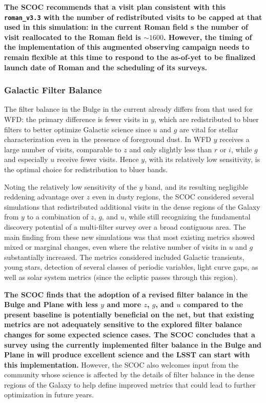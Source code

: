 {\bf The SCOC recommends that a visit plan consistent with this \texttt{roman\_v3.3} with the number of redistributed visits to be capped at that used in this simulation: in the current Roman field \opsim s the number of visit reallocated to the Roman field is $\sim1600$. However, the timing of the implementation of this augmented observing campaign needs to remain flexible at this time to respond to the as-of-yet to be finalized launch date of Roman and the scheduling of its surveys.}


\subsubsection{Galactic Filter Balance}\label{sec:subG:filterbalance}

The filter balance in the Bulge in the current  already differs from that used for WFD: the primary difference is fewer visits in $y$, which are redistributed to bluer filters to better optimize Galactic science since $u$ and $g$ are vital for stellar characterization even in the presence of foreground dust. In WFD $y$ receives a large number of visits, comparable to $z$ and only slightly less than $r$ or $i$, while $g$ and especially $u$ receive fewer visits. Hence $y$, with its relatively low sensitivity, is the optimal choice for redistribution to bluer bands.

Noting the relatively low sensitivity of the $y$ band, and its resulting negligible reddening advantage over $z$ even in dusty regions, the SCOC considered several simulations that redistributed additional visits in the dense regions of the Galaxy from $y$ to a combination of $z$, $g$, and $u$, while still recognizing the fundamental discovery potential of a multi-filter survey over a broad contiguous area. The main finding from these new simulations was that most existing metrics showed mixed or marginal changes, even where the relative number of visits in $u$ and $g$ substantially increased. The metrics considered included Galactic transients, young stars, detection of several classes of periodic variables, light curve gaps, as well as solar system metrics (since the ecliptic passes through this region).

{\bf The SCOC finds that the adoption of a revised filter balance in the Bulge and Plane with less $y$ and more $z$, $g$, and $u$ compared to the present baseline is potentially beneficial on the net, but that existing metrics are not adequately sensitive to the explored filter balance changes for some expected science cases. The SCOC concludes that a survey using the currently implemented filter balance in the Bulge and Plane in  will produce excellent science and the LSST can start with this implementation.} 
However, the SCOC also welcomes input from the community whose science is affected by the details of filter balance in the dense regions of the Galaxy to help define improved metrics that could lead to further optimization in future years.


